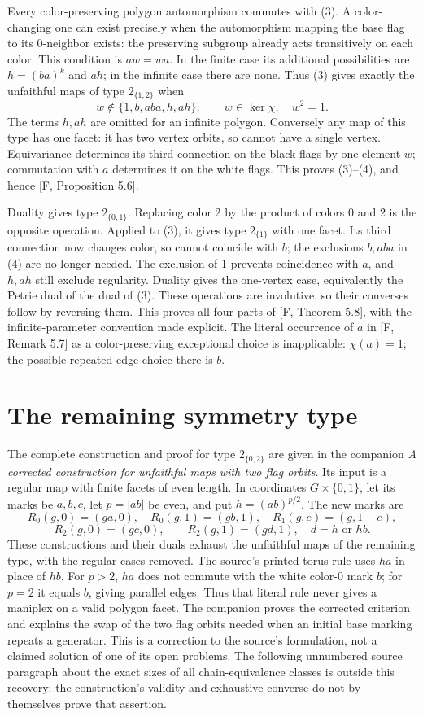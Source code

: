 \documentclass[a4paper,11pt]{article}
\begin{document}
Every color-preserving polygon automorphism commutes with (3).
A color-changing one can exist precisely when the automorphism
mapping the base flag to its 0-neighbor exists: the preserving
subgroup already acts transitively on each color. This condition
is $aw=wa$. In the finite case its additional possibilities are
$h=(ba)^k$ and $ah$; in the infinite case there are none.
Thus (3) gives exactly the unfaithful maps of type $2_{\{1,2\}}$
when
\[
 w\notin\{1,b,aba,h,ah\},\qquad w\in\ker\chi,
 \quad w^2=1.
 \tag{4}
\]
The terms $h,ah$ are omitted for an infinite polygon. Conversely
any map of this type has one facet: it has two vertex orbits, so
cannot have a single vertex. Equivariance determines its third
connection on the black flags by one element $w$; commutation with
$a$ determines it on the white flags. This proves (3)--(4), and
hence [F, Proposition 5.6].

Duality gives type $2_{\{0,1\}}$. Replacing color 2 by the
product of colors 0 and 2 is the opposite operation. Applied to
(3), it gives type $2_{\{1\}}$ with one facet. Its third
connection now changes color, so cannot coincide with $b$;
the exclusions $b,aba$ in (4) are no longer needed. The exclusion
of 1 prevents coincidence with $a$, and $h,ah$ still exclude
regularity. Duality gives the one-vertex case, equivalently the
Petrie dual of the dual of (3). These operations are involutive,
so their converses follow by reversing them. This proves all four
parts of [F, Theorem 5.8], with the infinite-parameter convention
made explicit. The literal occurrence of $a$ in [F, Remark 5.7]
as a color-preserving exceptional choice is inapplicable:
$\chi(a)=1$; the possible repeated-edge choice there is $b$.

\section{The remaining symmetry type}
The complete construction and proof for type $2_{\{0,2\}}$ are
given in the companion \emph{A corrected construction for unfaithful maps
with two flag orbits}.
Its input is a regular map with finite facets of even length.
In coordinates $G\times\{0,1\}$, let its marks be $a,b,c$,
let $p=|ab|$ be even, and put $h=(ab)^{p/2}$. The new marks are
\[
 R_0(g,0)=(ga,0),\quad R_0(g,1)=(gb,1),\quad
 R_1(g,e)=(g,1-e),
\]
\[
 R_2(g,0)=(gc,0),\qquad
 R_2(g,1)=(gd,1),\quad d=h\text{ or }hb.
 \tag{5}
\]
These constructions and their duals exhaust the unfaithful maps
of the remaining type, with the regular cases removed. The source's
printed torus rule uses $ha$ in place of $hb$. For $p>2$, $ha$
does not commute with the white color-0 mark $b$; for $p=2$ it
equals $b$, giving parallel edges. Thus that literal rule never
gives a maniplex on a valid polygon facet. The companion proves
the corrected criterion and explains the swap of the two flag
orbits needed when an initial base marking repeats a generator.
This is a correction to the source's formulation, not a claimed
solution of one of its open problems.
The following unnumbered source paragraph about the exact sizes of all
chain-equivalence classes is outside this recovery: the construction's
validity and exhaustive converse do not by themselves prove that assertion.
\end{document}
